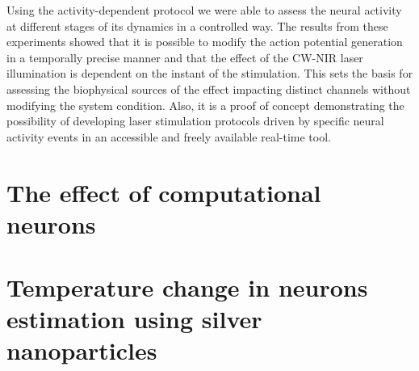 Using the activity-dependent protocol we were able to assess the neural activity at different stages of its dynamics in a controlled way. The results from these experiments showed that it is possible to modify the action potential generation in a temporally precise manner and that the effect of the CW-NIR laser illumination is dependent on the instant of the stimulation. This sets the basis for assessing the biophysical sources of the effect impacting distinct channels without modifying the system condition. Also, it is a proof of concept demonstrating the possibility of developing laser stimulation protocols driven by specific neural activity events in an accessible and freely available real-time tool.


\section{The effect of computational neurons}
\section{Temperature change in neurons estimation using silver nanoparticles}